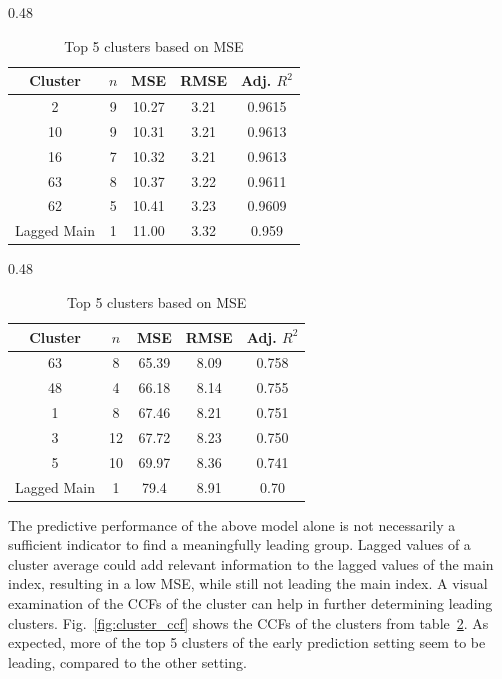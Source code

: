 \begin{table}[H]
\centering
\small
\begin{subtable}{0.48\textwidth}
\centering
\begin{tabular}{c c c c c}
\toprule
Cluster & $n$ & MSE & RMSE& Adj. $R^{2}$ \\
\midrule
2  & 9 & 10.27 & 3.21 & 0.9615 \\
10 & 9 & 10.31 & 3.21 & 0.9613 \\
16 & 7 & 10.32 & 3.21 & 0.9613 \\
63 & 8 & 10.37 & 3.22 & 0.9611 \\
62 & 5 & 10.41 & 3.23 & 0.9609 \\
\midrule
Lagged Main & 1 & 11.00 & 3.32 & 0.959 \\
\bottomrule
\end{tabular}
\caption{Considering lags 1 to 6.}
\end{subtable}\hfill
\begin{subtable}{0.48\textwidth}
\centering
\begin{tabular}{c c c c c}
\toprule
Cluster & $n$ & MSE & RMSE & Adj. $R^{2}$ \\
\midrule
63 & 8  & 65.39 & 8.09 & 0.758 \\
48 & 4  & 66.18 & 8.14 & 0.755 \\
1  & 8  & 67.46 & 8.21 & 0.751 \\
3  & 12 & 67.72 & 8.23 & 0.750 \\
5  & 10 & 69.97 & 8.36 & 0.741 \\
\midrule
Lagged Main  & 1 & 79.4 & 8.91 & 0.70\\
\bottomrule
\end{tabular}
\caption{Considering lags 4 to 6}
\end{subtable}
\caption{Top 5 clusters based on MSE}
\label{tab:clusterMSE}
\end{table}

The predictive performance of the above model alone is not necessarily a sufficient indicator to find a meaningfully leading group. Lagged values of a cluster average could add relevant information to the lagged values of the main index, resulting in a low MSE, while still not leading the main index. A visual examination of the CCFs of the cluster can help in further determining leading clusters. Fig.~\ref{fig:cluster_ccf} shows the CCFs of the clusters from table~\ref{tab:clusterMSE}. As expected, more of the top 5 clusters of the early prediction setting seem to be  leading, compared to the other setting. 

